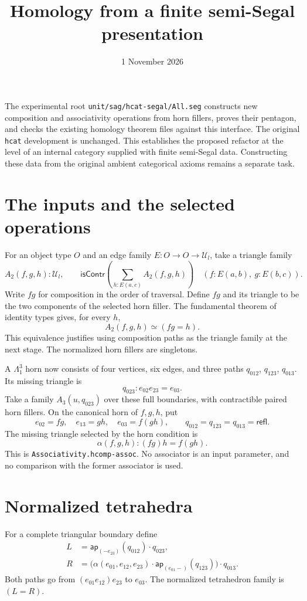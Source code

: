 \documentclass[11pt]{amsart}
\title{Homology from a finite semi-Segal presentation}
\date{1 November 2026}
\newcommand{\code}[1]{\nolinkurl{#1}}
\newcommand{\isContr}{\mathsf{isContr}}
\begin{document}
\maketitle

The experimental root \code{unit/sag/hcat-segal/All.seg} constructs new
composition and associativity operations from horn fillers, proves their
pentagon, and checks the existing homology theorem files against this
interface. The original \code{hcat} development is unchanged.
This establishes the proposed refactor at the level of an internal
category supplied with finite semi-Segal data. Constructing these data
from the original ambient categorical axioms remains a separate task.

\section{The inputs and the selected operations}

For an object type $O$ and an edge family $E:O\to O\to\mathcal U_l$,
take a triangle family
\[
 A_2(f,g,h):\mathcal U_l,\qquad
 \isContr\left(\sum_{h:E(a,c)}A_2(f,g,h)\right)
 \quad(f:E(a,b),\ g:E(b,c)).
\]
Write $fg$ for composition in the order of traversal. Define $fg$ and
its triangle to be the two components of the selected horn filler.
The fundamental theorem of identity types gives, for every $h$,
\[
 A_2(f,g,h)\simeq(fg=h).
\]
This equivalence justifies using composition paths as the triangle
family at the next stage. The normalized horn fillers are singletons.

A $\Lambda^3_1$ horn now consists of four vertices, six edges, and
three paths $q_{012}$, $q_{123}$, $q_{013}$. Its missing triangle is
\[
 q_{023}:e_{02}e_{23}=e_{03}.
\]
Take a family $A_3(u,q_{023})$ over these full boundaries, with
contractible paired horn fillers. On the canonical horn of $f,g,h$,
put
\[
 e_{02}=fg,\quad e_{13}=gh,\quad e_{03}=f(gh),\qquad
 q_{012}=q_{123}=q_{013}=\mathsf{refl}.
\]
The missing triangle selected by the horn condition is
\[
 \alpha(f,g,h):(fg)h=f(gh).
\]
This is \code{Associativity.hcomp-assoc}. No associator is an input
parameter, and no comparison with the former associator is used.

\section{Normalized tetrahedra}

For a complete triangular boundary define
\begin{align*}
 L&=\mathsf{ap}_{(-e_{23})}(q_{012})\cdot q_{023},\\
 R&=\bigl(\alpha(e_{01},e_{12},e_{23})\cdot
           \mathsf{ap}_{(e_{01}-)}(q_{123})\bigr)\cdot q_{013}.
\end{align*}
Both paths go from $(e_{01}e_{12})e_{23}$ to $e_{03}$.
The normalized tetrahedron family is $(L=R)$.
\end{document}
